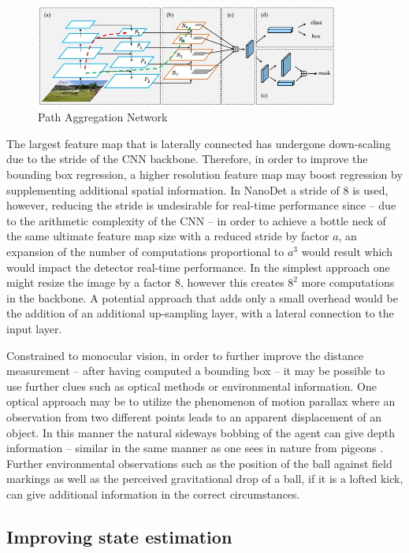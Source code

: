 \documentclass[a4paper,twoside,12pt]{report}
\begin{document}
\begin{figure}[h!]
\begin{center}
\includegraphics[width=10cm]{images/pan.jpg}
\caption{Path Aggregation Network \citep{pan}}
\label{fig:pan}
\end{center}
\end{figure}

The largest feature map that is laterally connected has undergone down-scaling due to the stride of the CNN backbone. Therefore, in order to improve the bounding box regression, a higher resolution feature map may boost regression by supplementing additional spatial information. In NanoDet a stride of 8 is used, however, reducing the stride is undesirable for real-time performance since -- due to the arithmetic complexity of the CNN -- in order to achieve a bottle neck of the same ultimate feature map size with a reduced stride by factor $a$, an expansion of the number of computations proportional to $a^3$ would result which would impact the detector real-time performance. In the simplest approach one might resize the image by a factor $8$, however this creates $8^2$ more computations in the backbone. A potential approach that adds only a small overhead would be the addition of an additional up-sampling layer, with a lateral connection to the input layer.

Constrained to monocular vision, in order to further improve the distance measurement -- after having computed a bounding box -- it may be possible to use further clues such as optical methods or environmental information. One optical approach may be to utilize the phenomenon of motion parallax  where an observation from two different points leads to an apparent displacement of an object. In this manner the natural sideways bobbing of the agent can give depth information -- similar in the same manner as one sees in nature from pigeons \citep{parrelax}. Further environmental observations such as the position of the ball against field markings as well as the perceived gravitational drop of a ball, if it is a lofted kick, can give additional information in the correct circumstances.

\subsection{Improving state estimation}
\end{document}
